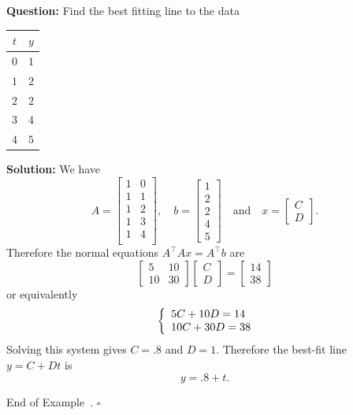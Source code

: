 \documentclass[10pt]{article}
\theoremstyle{definition}
\newtheorem{example}[theorem]{Example}
\renewenvironment{example}
{\begin{oldexample}}
  {\par\smallskip\hfill   End of Example~\theexample. $\square$    \par\end{oldexample}}
\newcommand{\vt}{\vskip 5mm} %
\newcommand{\Fl}{\vt\noindent\textbf} %
\newcommand{\1}[1]{\textbf{1}_{\left[#1\right]}} %
\begin{document}
\begin{example}
  \Fl{Question:} Find the best fitting line to the data
  \begin{center}
    \begin{tabular}{c|c}
      $t$ & $y$ \\
      \hline
      $0$ & $1$ \\
      $1$ & $2$ \\
      $2$ & $2$ \\
      $3$ & $4$ \\
      $4$ & $5$ \\
    \end{tabular}
  \end{center}
  \Fl{Solution:} We have
  \begin{equation*}
    A =
    \begin{bmatrix}
      1&0\\
      1&1\\
      1&2\\
      1&3\\
      1&4\\
    \end{bmatrix},
    \quad
    b =
    \begin{bmatrix}
      1\\2\\2\\4\\5
    \end{bmatrix}
    \quad \text{and} \quad 
    x =
    \begin{bmatrix}
      C\\D
    \end{bmatrix}.
  \end{equation*}
  Therefore the normal equations $A^{\top}Ax=A^{\top}b$ are
  \begin{equation*}
    \begin{bmatrix}
      5&10\\
      10&30
    \end{bmatrix}
    \begin{bmatrix}
      C\\D
    \end{bmatrix}
    =
    \begin{bmatrix}
      14\\38
    \end{bmatrix}
  \end{equation*}
  or equivalently
  \begin{equation*}
    \left\{ \begin{array}{l@{}l} 5C+10D=14 \\10C+30D=38  \end{array}\right.
  \end{equation*}
  Solving this system gives $C=.8$ and $D=1$. Therefore the best-fit line $y=C+Dt$ is 
  \begin{equation*}
    y = .8+t.
  \end{equation*}
\end{example}
\end{document}

